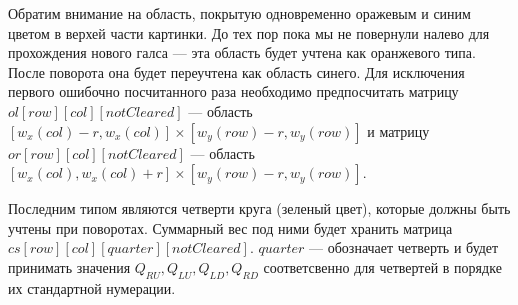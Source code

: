 Обратим внимание на область, покрытую одновременно оражевым и синим цветом в верхей части картинки.
До тех пор пока мы не повернули налево для прохождения нового галса --- эта область будет
учтена как оранжевого типа. После поворота она будет переучтена как область синего.
Для исключения первого ошибочно посчитанного раза необходимо предпосчитать
матрицу $ol[row][col][notCleared]$ --- область $[w_x(col)-r, w_x(col)] \times [w_y(row)-r, w_y(row)]$
и матрицу $or[row][col][notCleared]$ --- область $[w_x(col),w_x(col)+r]\times [w_y(row)-r, w_y(row)]$.

Последним типом являются четверти круга (зеленый цвет), которые должны быть учтены при поворотах.
Суммарный вес под ними будет хранить матрица $cs[row][col][quarter][notCleared]$.
$quarter$ --- обозначает четверть и будет принимать значения $Q_{RU}, Q_{LU}, Q_{LD}, Q_{RD}$
соответсвенно для четвертей в порядке их стандартной нумерации.
\FloatBarrier
